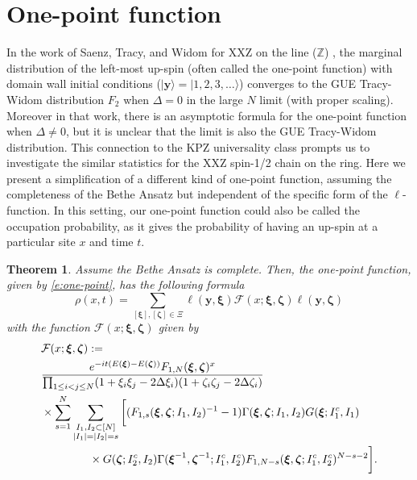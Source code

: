 \documentclass[a4paper,11pt]{article}
\newtheorem{theorem}{Theorem}[section]
\theoremstyle{definition}
\begin{document}
\section{One-point function}\label{s:one-point function}
In the work of Saenz, Tracy, and Widom for XXZ on the line ($\mathbb{Z}$) \cite{saenz_domain_2022}, the marginal distribution of the left-most up-spin (often called the one-point function) with domain wall initial conditions ($|\mathbf{y}\rangle=|1, 2, 3,\ldots\rangle$) converges to the GUE Tracy-Widom distribution $F_2$ when $\Delta=0$ in the large $N$ limit (with proper scaling). Moreover in that work, there is an asymptotic formula for the one-point function when $\Delta \neq 0$, but it is unclear that the limit is also the GUE Tracy-Widom distribution. This connection to the KPZ universality class prompts us to investigate the similar statistics for the XXZ spin-1/2 chain on the ring. Here we present a simplification of a different kind of one-point function, assuming the completeness of the Bethe Ansatz but independent of the specific form of the $\ell$-function. In this setting, our one-point function could also be called the occupation probability, as it gives the probability of having an up-spin at a particular site $x$ and time $t$. 

\begin{theorem}\label{t:one-point}
Assume the Bethe Ansatz is complete. Then, the one-point function, given by \eqref{e:one-point}, has the following formula 
\begin{equation}
    \rho(x,t) = \sum_{[\boldsymbol{\xi}], [\boldsymbol{\zeta}] \in \Xi} \ell(\mathbf{y}, \boldsymbol{\xi}) \mathcal{F}(x; \boldsymbol{\xi}, \boldsymbol{\zeta})\ell(\mathbf{y}, \boldsymbol{\zeta})
\end{equation}
with the function $\mathcal{F}(x; \boldsymbol{\xi}, \boldsymbol{\zeta})$ given by
\begin{equation}
\begin{split}
    &\mathcal{F}(x;\boldsymbol{\xi}, \boldsymbol{\zeta}) :=\\
    &\frac{e^{-it(E(\boldsymbol{\xi})-E(\boldsymbol{\zeta}))}F_{1,N}(\boldsymbol{\xi}, \boldsymbol{\zeta})^x }{\prod_{1 \leq i <j \leq N}(1 + \xi_i \xi_j - 2 \Delta \xi_i)(1 + \zeta_i \zeta_j - 2 \Delta \zeta_i)}\\
    &\times\sum_{s = 1}^{N} \sum_{\substack{I_1, I_2 \subset [N]\\|I_1|=|I_2| = s}} \bigg[ ( F_{1, s}(\boldsymbol{\xi}, \boldsymbol{\zeta}; I_1, I_2)^{-1}-1)\Gamma(\boldsymbol{\xi}, \boldsymbol{\zeta}; I_1, I_2)G(\boldsymbol{\xi}; I_1^c, I_1)\\
    &\hspace{15mm}\times G(\boldsymbol{\zeta}; I_2^c, I_2)\Gamma(\boldsymbol{\xi}^{-1}, \boldsymbol{\zeta}^{-1}; I_1^c, I_2^c) F_{1, N-s}(\boldsymbol{\xi}, \boldsymbol{\zeta}; I_1^c, I_2^c)^{N-s-2}\bigg].
\end{split}
\end{equation}
\end{theorem}
\end{document}
